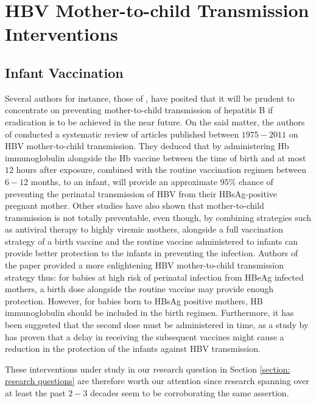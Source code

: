 \section{HBV Mother-to-child Transmission Interventions}
\subsection{Infant Vaccination}
Several authors for instance, those of \cite{tran2009management,andersson2015mother, xu2013nextstep,shimakawa2016mother}, have posited that it will be prudent to concentrate on preventing mother-to-child transmission of hepatitis B if eradication is to be achieved in the near future. On the said matter, the authors of \cite{Pan2012} conducted a systematic review of articles published between $1975-2011$ on HBV mother-to-child transmission. They deduced that by administering Hb immunoglobulin alongside the Hb vaccine between the time of birth and at most $12$ hours after exposure, combined with the routine vaccination regimen between $6-12$ months, to an infant, will provide an approximate $95\%$ chance of preventing the perinatal transmission of HBV from their HBsAg-positive pregnant mother. Other studies have also shown that mother-to-child transmission is not totally preventable, even though, by combining strategies such as antiviral therapy to highly viremic mothers, alongside a full vaccination strategy of a birth vaccine and the routine vaccine administered to infants can provide better protection to the infants\cite{tran2009management} in preventing the infection. Authors of the paper \cite{tran2009management} provided a more enlightening HBV mother-to-child transmission strategy thus: for babies at high risk of perinatal infection from HBeAg infected mothers, a birth dose alongside the routine vaccine may provide enough protection. However, for babies born to HBsAg positive mothers, HB immunoglobulin should be included in the birth regimen. Furthermore, it has been suggested that the second dose must be administered in time, as a study by \cite{tharmaphornpilas2009increasedRisk} has proven that a delay in receiving the subsequent vaccines might cause a reduction in the protection of the infants against HBV transmission. 

These interventions under study in our research question in Section \ref{section: research questions} are therefore worth our attention since research spanning over at least the past $2-3$ decades seem to be corroborating the same assertion. 

